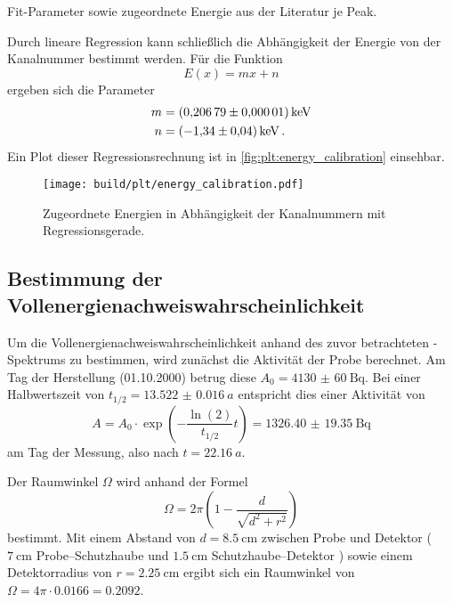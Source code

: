 \begin{table}
    \centering
    \caption{Fit-Parameter sowie zugeordnete Energie aus der Literatur \cite{lara} je Peak.}
    \label{tab:1_energiekalibrierung}
\end{table}

Durch lineare Regression kann schließlich die Abhängigkeit der Energie von der Kanalnummer bestimmt werden.
Für die Funktion
\begin{equation*}
    E(x) = m x + n
\end{equation*}
ergeben sich die Parameter
\begin{align*}
    m &= \SI{0.20679 \pm 0.00001}{\kilo\electronvolt} \\
    n &= \SI{-1.34 \pm 0.04}{\kilo\electronvolt} \, .
\end{align*}
Ein Plot dieser Regressionsrechnung ist in \autoref{fig:plt:energy_calibration} einsehbar.

\begin{figure}
    \centering
    \texttt{[image: build/plt/energy\_calibration.pdf]}
    \caption{Zugeordnete Energien in Abhängigkeit der Kanalnummern mit Regressionsgerade.}
    \label{fig:plt:energy_calibration}
\end{figure}


\FloatBarrier %
\subsection{Bestimmung der Vollenergienachweiswahrscheinlichkeit} \label{sec:auswertung:effizienz}
Um die Vollenergienachweiswahrscheinlichkeit anhand des zuvor betrachteten -Spektrums zu bestimmen,
wird zunächst die Aktivität der Probe berechnet.
Am Tag der Herstellung (01.10.2000) betrug diese $A_0 = \SI{4130(60)}{\becquerel}$.
Bei einer Halbwertszeit von $t_{1/2} = \SI{13.522(16)}{a}$ \cite{lara} entspricht dies einer Aktivität von
\begin{equation*}
    A = A_0 \cdot \exp\left(-\frac{\ln(2)}{t_{1/2}} t\right)
    = \SI{1326.40(1935)}{\becquerel}
\end{equation*}
am Tag der Messung,
also nach $t = \SI{22.16}{a}$.

Der Raumwinkel $\Omega$ wird anhand der Formel
\begin{equation*}
    \Omega = 2\pi \left( 1 - \frac{d}{\sqrt{d^2 + r^2}} \right)
\end{equation*}
bestimmt.
Mit
    einem Abstand von $d = \SI{8.5}{\centi\meter}$ zwischen Probe und Detektor
        (
            $\SI{7}{\centi\meter}$ Probe–Schutzhaube
            und
            $\SI{1.5}{\centi\meter}$ Schutzhaube–Detektor
        )
    sowie einem Detektorradius von $r = \SI{2.25}{\centi\meter}$
ergibt sich ein Raumwinkel von
$\Omega = 4\pi \cdot \num{0.0166} = \num{0.2092}$.

